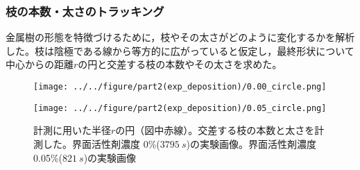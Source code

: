 \documentclass[autodetect-engine,dvi=dvipdfmx,a4paper,ja=standard,oneside,openany,11pt,draft]{bxjsbook}
\begin{document}
\subsubsection{枝の本数・太さのトラッキング}
金属樹の形態を特徴づけるために，枝やその太さがどのように変化するかを解析した。枝は陰極である線から等方的に広がっていると仮定し，最終形状について中心からの距離$r$の円と交差する枝の本数やその太さを求めた。
\begin{figure}[htbp]
  \begin{minipage}
    {0.5\textwidth}
    \subcaption{}
    \centering
    \texttt{[image: ../../figure/part2(exp\_deposition)/0.00\_circle.png]}
    \label{fig:0.00_circle}
  \end{minipage}
  \begin{minipage}
    {0.5\textwidth}
    \subcaption{}
    \centering
    \texttt{[image: ../../figure/part2(exp\_deposition)/0.05\_circle.png]}
    \label{fig:0.05_circle}
  \end{minipage}
  \caption{計測に用いた半径$r$の円（図中赤線）。交差する枝の本数と太さを計測した。界面活性剤濃度 0\%($\SI{3795}{s}$)の実験画像。界面活性剤濃度 0.05\%($\SI{821}{s}$)の実験画像}
\end{figure}
\end{document}
